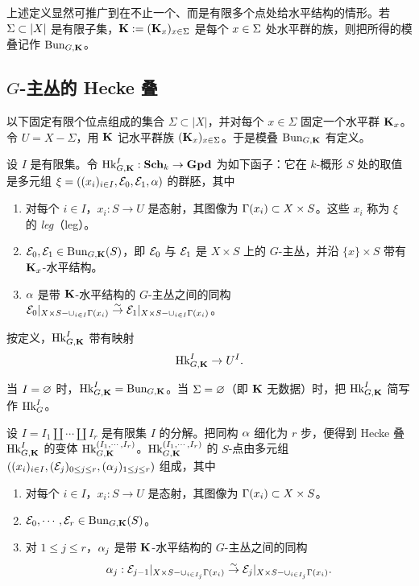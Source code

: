 上述定义显然可推广到在不止一个、而是有限多个点处给水平结构的情形。若 $\Sigma\subset |X|$ 是有限子集，$\mathbf{K}:=(\mathbf{K}_{x})_{x\in \Sigma}$ 是每个 $x\in\Sigma$ 处水平群的族，则把所得的模叠记作 $\textup{Bun}_{G,\mathbf{K}}$。



\subsection{$G$-主丛的 Hecke 叠}
以下固定有限个位点组成的集合 $\Sigma\subset |X|$，并对每个 $x\in \Sigma$ 固定一个水平群 $\mathbf{K}_{x}$。令 $U=X-\Sigma$，用 $\mathbf{K}$ 记水平群族 $(\mathbf{K}_{x})_{x\in \Sigma}$。于是模叠 $\textup{Bun}_{G,\mathbf{K}}$ 有定义。


\label{sss:Hk}

设 $I$ 是有限集。令 $\textup{Hk}^{I}_{G,\mathbf{K}}: \mathbf{Sch}_{k}\to \mathbf{Gpd}$ 为如下函子：它在 $k$-概形 $S$ 处的取值是多元组 $\xi=((x_{i})_{i\in I}, \mathcal{E}_{0},\mathcal{E}_{1} ,\alpha)$ 的群胚，其中
\begin{enumerate}
\item 对每个 $i\in I$，$x_{i}: S\to U$ 是态射，其图像为 $\Gamma(x_{i})\subset X\times S$。这些 $x_{i}$ 称为 $\xi$ 的 {\em leg}（leg）。
\item $\mathcal{E}_{0},\mathcal{E}_{1}\in \textup{Bun}_{G,\mathbf{K}}(S)$，即 $\mathcal{E}_{0}$ 与 $\mathcal{E}_{1}$ 是 $X\times S$ 上的 $G$-主丛，并沿 $\{x\}\times S$ 带有 $\mathbf{K}_{x}$-水平结构。
\item $\alpha$ 是带 $\mathbf{K}$-水平结构的 $G$-主丛之间的同构 $\mathcal{E}_{0}|_{X\times S-\cup_{i\in I}\Gamma(x_{i})}\stackrel{\sim}{\to} \mathcal{E}_{1}|_{X\times S-\cup_{i\in I}\Gamma(x_{i})}$。
\end{enumerate}

按定义，$\textup{Hk}_{G,\mathbf{K}}^{I}$ 带有映射
\begin{equation*}
\textup{Hk}^{I}_{G,\mathbf{K}}\to U^{I}.
\end{equation*}

当 $I=\varnothing$ 时，$\textup{Hk}^{I}_{G,\mathbf{K}}=\textup{Bun}_{G,\mathbf{K}}$。当 $\Sigma=\varnothing$（即 $\mathbf{K}$ 无数据）时，把 $\textup{Hk}^{I}_{G,\mathbf{K}}$ 简写作 $\textup{Hk}^{I}_{G}$。


\label{sss:it Hk}
设 $I=I_{1}\coprod \cdots\coprod I_{r}$ 是有限集 $I$ 的分解。把同构 $\alpha$ 细化为 $r$ 步，便得到 Hecke 叠 $\textup{Hk}^{I}_{G,\mathbf{K}}$ 的变体 $\textup{Hk}^{(I_{1},\cdots, I_{r})}_{G,\mathbf{K}}$。$\textup{Hk}^{(I_{1},\cdots, I_{r})}_{G,\mathbf{K}}$ 的 $S$-点由多元组 $((x_{i})_{i\in I}, (\mathcal{E}_{j})_{0\le j\le r} ,(\alpha_{j})_{1\le j\le r})$ 组成，其中
\begin{enumerate}
\item 对每个 $i\in I$，$x_{i}: S\to U$ 是态射，其图像为 $\Gamma(x_{i})\subset X\times S$。
\item $\mathcal{E}_{0},\cdots, \mathcal{E}_{r}\in \textup{Bun}_{G,\mathbf{K}}(S)$。
\item 对 $1\le j\le r$，$\alpha_{j}$ 是带 $\mathbf{K}$-水平结构的 $G$-主丛之间的同构
$$\alpha_{j}: \mathcal{E}_{j-1}|_{X\times S-\cup_{i\in I_{j}}\Gamma(x_{i})}\stackrel{\sim}{\to} \mathcal{E}_{j}|_{X\times S-\cup_{i\in I_{j}}\Gamma(x_{i})}.$$
\end{enumerate}

